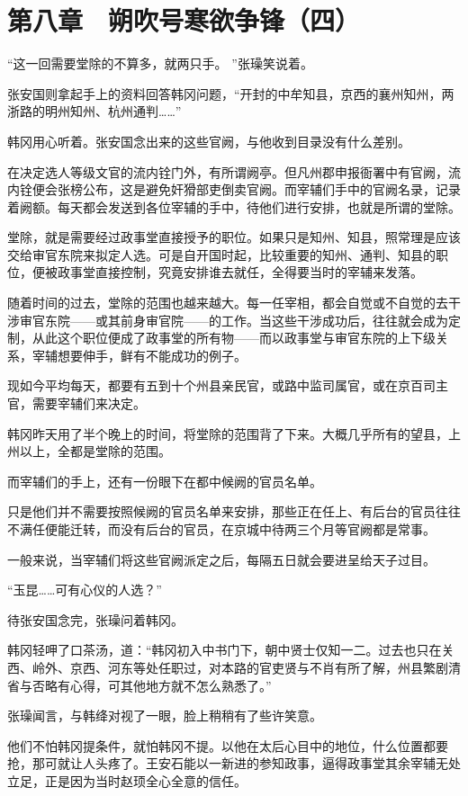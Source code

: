 \section{第八章　朔吹号寒欲争锋（四）}

“这一回需要堂除的不算多，就两只手。 ”张璪笑说着。

张安国则拿起手上的资料回答韩冈问题，“开封的中牟知县，京西的襄州知州，两浙路的明州知州、杭州通判……”

韩冈用心听着。张安国念出来的这些官阙，与他收到目录没有什么差别。

在决定选人等级文官的流内铨门外，有所谓阙亭。但凡州郡申报衙署中有官阙，流内铨便会张榜公布，这是避免奸猾部吏倒卖官阙。而宰辅们手中的官阙名录，记录着阙额。每天都会发送到各位宰辅的手中，待他们进行安排，也就是所谓的堂除。

堂除，就是需要经过政事堂直接授予的职位。如果只是知州、知县，照常理是应该交给审官东院来拟定人选。可是自开国时起，比较重要的知州、通判、知县的职位，便被政事堂直接控制，究竟安排谁去就任，全得要当时的宰辅来发落。

随着时间的过去，堂除的范围也越来越大。每一任宰相，都会自觉或不自觉的去干涉审官东院——或其前身审官院——的工作。当这些干涉成功后，往往就会成为定制，从此这个职位便成了政事堂的所有物——而以政事堂与审官东院的上下级关系，宰辅想要伸手，鲜有不能成功的例子。

现如今平均每天，都要有五到十个州县亲民官，或路中监司属官，或在京百司主官，需要宰辅们来决定。

韩冈昨天用了半个晚上的时间，将堂除的范围背了下来。大概几乎所有的望县，上州以上，全都是堂除的范围。

而宰辅们的手上，还有一份眼下在都中候阙的官员名单。

只是他们并不需要按照候阙的官员名单来安排，那些正在任上、有后台的官员往往不满任便能迁转，而没有后台的官员，在京城中待两三个月等官阙都是常事。

一般来说，当宰辅们将这些官阙派定之后，每隔五日就会要进呈给天子过目。

“玉昆……可有心仪的人选？”

待张安国念完，张璪问着韩冈。

韩冈轻呷了口茶汤，道：“韩冈初入中书门下，朝中贤士仅知一二。过去也只在关西、岭外、京西、河东等处任职过，对本路的官吏贤与不肖有所了解，州县繁剧清省与否略有心得，可其他地方就不怎么熟悉了。”

张璪闻言，与韩绛对视了一眼，脸上稍稍有了些许笑意。

他们不怕韩冈提条件，就怕韩冈不提。以他在太后心目中的地位，什么位置都要抢，那可就让人头疼了。王安石能以一新进的参知政事，逼得政事堂其余宰辅无处立足，正是因为当时赵顼全心全意的信任。

